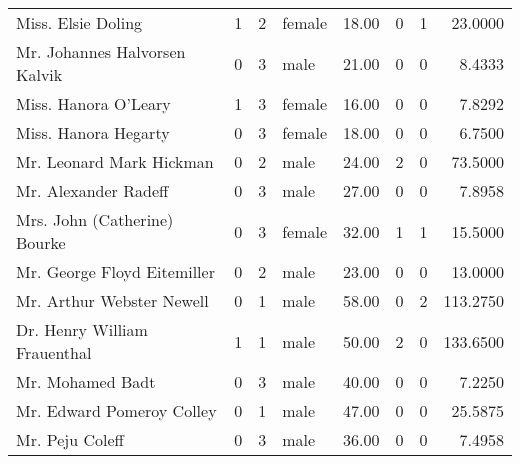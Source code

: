 \begin{tabular}{lrrlrrrr}
Miss. Elsie Doling                                 &         1 &       2 &  female &  18.00 &                        0 &                        1 &   23.0000 \\
Mr. Johannes Halvorsen Kalvik                      &         0 &       3 &    male &  21.00 &                        0 &                        0 &    8.4333 \\
Miss. Hanora O'Leary                               &         1 &       3 &  female &  16.00 &                        0 &                        0 &    7.8292 \\
Miss. Hanora Hegarty                               &         0 &       3 &  female &  18.00 &                        0 &                        0 &    6.7500 \\
Mr. Leonard Mark Hickman                           &         0 &       2 &    male &  24.00 &                        2 &                        0 &   73.5000 \\
Mr. Alexander Radeff                               &         0 &       3 &    male &  27.00 &                        0 &                        0 &    7.8958 \\
Mrs. John (Catherine) Bourke                       &         0 &       3 &  female &  32.00 &                        1 &                        1 &   15.5000 \\
Mr. George Floyd Eitemiller                        &         0 &       2 &    male &  23.00 &                        0 &                        0 &   13.0000 \\
Mr. Arthur Webster Newell                          &         0 &       1 &    male &  58.00 &                        0 &                        2 &  113.2750 \\
Dr. Henry William Frauenthal                       &         1 &       1 &    male &  50.00 &                        2 &                        0 &  133.6500 \\
Mr. Mohamed Badt                                   &         0 &       3 &    male &  40.00 &                        0 &                        0 &    7.2250 \\
Mr. Edward Pomeroy Colley                          &         0 &       1 &    male &  47.00 &                        0 &                        0 &   25.5875 \\
Mr. Peju Coleff                                    &         0 &       3 &    male &  36.00 &                        0 &                        0 &    7.4958 \\

\end{tabular}
